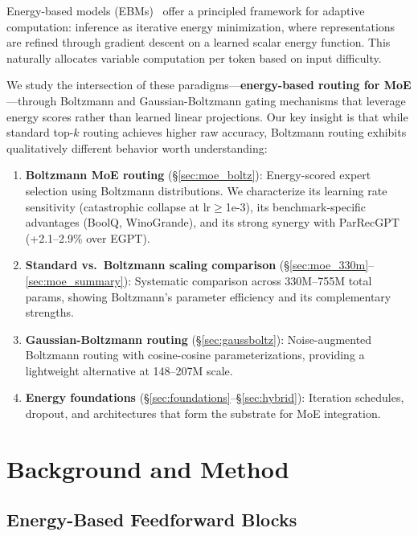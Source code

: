 \documentclass[oneside]{article}
\begin{document}
Energy-based models (EBMs)~\citep{lecun2006tutorial,du2019implicit} offer a principled framework for adaptive computation: inference as iterative energy minimization, where representations are refined through gradient descent on a learned scalar energy function. This naturally allocates variable computation per token based on input difficulty.

We study the intersection of these paradigms---\textbf{energy-based routing for MoE}---through Boltzmann and Gaussian-Boltzmann gating mechanisms that leverage energy scores rather than learned linear projections. Our key insight is that while standard top-$k$ routing achieves higher raw accuracy, Boltzmann routing exhibits qualitatively different behavior worth understanding:

\begin{enumerate}
    \item \textbf{Boltzmann MoE routing} (\S\ref{sec:moe_boltz}): Energy-scored expert selection using Boltzmann distributions. We characterize its learning rate sensitivity (catastrophic collapse at lr$\geq$1e-3), its benchmark-specific advantages (BoolQ, WinoGrande), and its strong synergy with ParRecGPT (+2.1--2.9\% over EGPT).
    \item \textbf{Standard vs.\ Boltzmann scaling comparison} (\S\ref{sec:moe_330m}--\ref{sec:moe_summary}): Systematic comparison across 330M--755M total params, showing Boltzmann's parameter efficiency and its complementary strengths.
    \item \textbf{Gaussian-Boltzmann routing} (\S\ref{sec:gaussboltz}): Noise-augmented Boltzmann routing with cosine-cosine parameterizations, providing a lightweight alternative at 148--207M scale.
    \item \textbf{Energy foundations} (\S\ref{sec:foundations}--\S\ref{sec:hybrid}): Iteration schedules, dropout, and architectures that form the substrate for MoE integration.
\end{enumerate}


\section{Background and Method}

\subsection{Energy-Based Feedforward Blocks}
\end{document}
